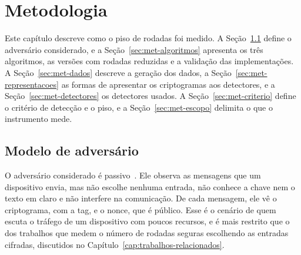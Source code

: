 
\chapter{Metodologia}
\label{cap:metodologia}

Este capítulo descreve como o piso de rodadas foi medido. A Seção~\ref{sec:met-adversario} define o adversário considerado, e a Seção~\ref{sec:met-algoritmos} apresenta os três algoritmos, as versões com rodadas reduzidas e a validação das implementações. A Seção~\ref{sec:met-dados} descreve a geração dos dados, a Seção~\ref{sec:met-representacoes} as formas de apresentar os criptogramas aos detectores, e a Seção~\ref{sec:met-detectores} os detectores usados. A Seção~\ref{sec:met-criterio} define o critério de detecção e o piso, e a Seção~\ref{sec:met-escopo} delimita o que o instrumento mede.

\section{Modelo de adversário}
\label{sec:met-adversario}

O adversário considerado é passivo~\cite{KatzLindell2014IMC}. Ele observa as mensagens que um dispositivo envia, mas não escolhe nenhuma entrada, não conhece a chave nem o texto em claro e não interfere na comunicação. De cada mensagem, ele vê o criptograma, com a tag, e o nonce, que é público. Esse é o cenário de quem escuta o tráfego de um dispositivo com poucos recursos, e é mais restrito que o dos trabalhos que medem o número de rodadas seguras escolhendo as entradas cifradas, discutidos no Capítulo~\ref{cap:trabalhos-relacionados}.

